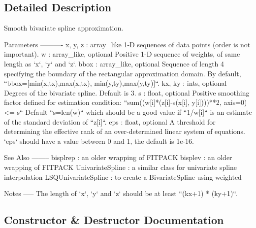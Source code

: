 \subsection{Detailed Description}
\begin{DoxyVerb}Smooth bivariate spline approximation.

Parameters
----------
x, y, z : array_like
    1-D sequences of data points (order is not important).
w : array_like, optional
    Positive 1-D sequence of weights, of same length as `x`, `y` and `z`.
bbox : array_like, optional
    Sequence of length 4 specifying the boundary of the rectangular
    approximation domain.  By default,
    ``bbox=[min(x,tx),max(x,tx), min(y,ty),max(y,ty)]``.
kx, ky : ints, optional
    Degrees of the bivariate spline. Default is 3.
s : float, optional
    Positive smoothing factor defined for estimation condition:
    ``sum((w[i]*(z[i]-s(x[i], y[i])))**2, axis=0) <= s``
    Default ``s=len(w)`` which should be a good value if ``1/w[i]`` is an
    estimate of the standard deviation of ``z[i]``.
eps : float, optional
    A threshold for determining the effective rank of an over-determined
    linear system of equations. `eps` should have a value between 0 and 1,
    the default is 1e-16.

See Also
--------
bisplrep : an older wrapping of FITPACK
bisplev : an older wrapping of FITPACK
UnivariateSpline : a similar class for univariate spline interpolation
LSQUnivariateSpline : to create a BivariateSpline using weighted

Notes
-----
The length of `x`, `y` and `z` should be at least ``(kx+1) * (ky+1)``.\end{DoxyVerb}
 

\subsection{Constructor \& Destructor Documentation}
\hypertarget{classscipy_1_1interpolate_1_1fitpack2_1_1SmoothBivariateSpline_a2a5715e873c68fac0083919130bdecd0}{}
